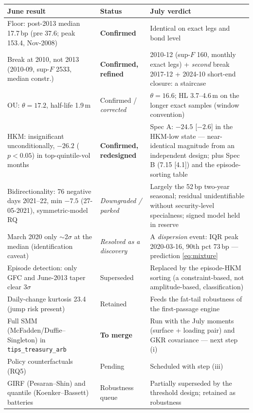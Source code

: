 \documentclass[11pt]{article}
\begin{document}
\begin{table}[h!]
\centering\small
\setlength{\tabcolsep}{3.5pt}\begin{tabular}{p{5.3cm}p{3.1cm}p{5.5cm}}
\toprule
June result & Status & July verdict \\
\midrule
Floor: post-2013 median 17.7\,bp (pre 37.6; peak 153.4, Nov-2008) & \textbf{Confirmed} & Identical on exact legs and bond level \\
Break at 2010, not 2013 (2010-09, sup-$F$ 2533, median constr.) & \textbf{Confirmed, refined} & 2010-12 (sup-$F$ 160, monthly exact legs) + \emph{second} break 2017-12 + 2024-10 short-end closure: a staircase \\
OU: $\theta=17.2$, half-life 1.9\,m & Confirmed / \emph{corrected} & $\theta=16.6$; HL 3.7--4.6\,m on the longer exact samples (window convention) \\
HKM: insignificant unconditionally, $-26.2$ ($p<0.05$) in top-quintile-vol months & \textbf{Confirmed, redesigned} & Spec A: $-24.5$ [$-2.6$] in the HKM-low state --- near-identical magnitude from an independent design; plus Spec B (7.15 [4.1]) and the episode-sorting table \\
Bidirectionality: 76 negative days 2021--22, min $-7.5$ (27-05-2021), symmetric-model RQ & \emph{Downgraded / parked} & Largely the 52\,bp two-year seasonal; residual unidentifiable without security-level specialness; signed model held in reserve \\
March 2020 only $\sim$2$\sigma$ at the median (identification caveat) & \emph{Resolved as a discovery} & A \emph{dispersion} event: IQR peak 2020-03-16, 90th pct 73\,bp --- prediction \eqref{eq:mixture} \\
Episode detection: only GFC and June-2013 taper clear 3$\sigma$ & Superseded & Replaced by the episode-HKM sorting (a constraint-based, not amplitude-based, classification) \\
Daily-change kurtosis 23.4 (jump risk present) & Retained & Feeds the fat-tail robustness of the first-passage engine \\
Full SMM (McFadden/Duffie--Singleton) in \texttt{tips\_treasury\_arb} & \textbf{To merge} & Run with the July moments (surface + loading pair) and GKR covariance --- next step (i) \\
Policy counterfactuals (RQ5) & Pending & Scheduled with step (iii) \\
GIRF (Pesaran--Shin) and quantile (Koenker--Bassett) batteries & Robustness queue & Partially superseded by the threshold design; retained as robustness \\
\bottomrule
\end{tabular}
\end{table}
\end{document}
